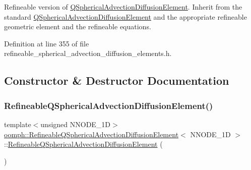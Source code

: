 Refineable version of \hyperlink{classoomph_1_1QSphericalAdvectionDiffusionElement}{Q\+Spherical\+Advection\+Diffusion\+Element}. Inherit from the standard \hyperlink{classoomph_1_1QSphericalAdvectionDiffusionElement}{Q\+Spherical\+Advection\+Diffusion\+Element} and the appropriate refineable geometric element and the refineable equations. 

Definition at line 355 of file refineable\+\_\+spherical\+\_\+advection\+\_\+diffusion\+\_\+elements.\+h.



\subsection{Constructor \& Destructor Documentation}
\mbox{\label{classoomph_1_1RefineableQSphericalAdvectionDiffusionElement_ad8620ec5ee99a7ed793c5d90df04137d}} 
\subsubsection{\texorpdfstring{Refineable\+Q\+Spherical\+Advection\+Diffusion\+Element()}{RefineableQSphericalAdvectionDiffusionElement()}\hspace{0.1cm}{\footnotesize\ttfamily [1/2]}}
{\footnotesize\ttfamily template$<$unsigned N\+N\+O\+D\+E\+\_\+1D$>$ \\
\hyperlink{classoomph_1_1RefineableQSphericalAdvectionDiffusionElement}{oomph\+::\+Refineable\+Q\+Spherical\+Advection\+Diffusion\+Element}$<$ N\+N\+O\+D\+E\+\_\+1D $>$\+::\hyperlink{classoomph_1_1RefineableQSphericalAdvectionDiffusionElement}{Refineable\+Q\+Spherical\+Advection\+Diffusion\+Element} (\begin{DoxyParamCaption}{ }\end{DoxyParamCaption})\hspace{0.3cm}{\ttfamily [inline]}}



